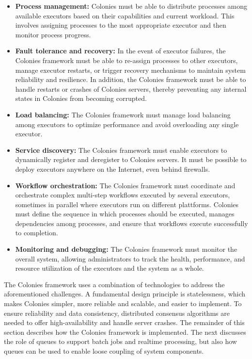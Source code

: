 \documentclass{article}
\begin{document}
\begin{itemize}
\item \textbf{Process management:} Colonies must be able to distribute processes among available executors based on their capabilities and current workload. This involves assigning processes to the most appropriate executor and then monitor process progress.

\item \textbf{Fault tolerance and recovery:} In the event of executor failures, the Colonies framework must be able to re-assign processes to other executors, manage executor restarts, or trigger recovery mechanisms to maintain system reliability and resilience. In addition, the Colonies framework must be able to handle restarts or crashes of Colonies servers, thereby preventing any internal states in Colonies from becoming corrupted. 

\item \textbf{Load balancing:} The Colonies framework must manage load balancing among executors to optimize performance and avoid overloading any single executor.

\item \textbf{Service discovery:} The Colonies framework must enable executors to dynamically register and deregister to Colonies servers. It must be possible to deploy executors anywhere on the Internet, even behind firewalls.

\item \textbf{Workflow orchestration:} The Colonies framework must coordinate and orchestrate complex multi-step workflows executed by several executors, sometimes in parallel where executors run on different plattforms. Colonies must define the sequence in which processes should be executed, manages dependencies among processes, and ensure that workflows execute successfully to completion.

\item \textbf{Monitoring and debugging:} The Colonies framework must monitor the overall system, allowing administrators to track the health, performance, and resource utilization of the executors and the system as a whole.
\end{itemize}

The Colonies framework uses a combination of technologies to address the aforementioned challenges. A fundamental design principle is statelessness, which makes Colonies simpler, more reliable and scalable, and easier to implement. To ensure reliability and data consistency, distributed consensus algorithms are needed to offer high-availability and handle server crashes. The remainder of this section describes how the Colonies framework is implemented. The next discusses the role of queues to support batch jobs and realtime processing, but also how queues can be used to enable loose coupling of system components.
\end{document}

